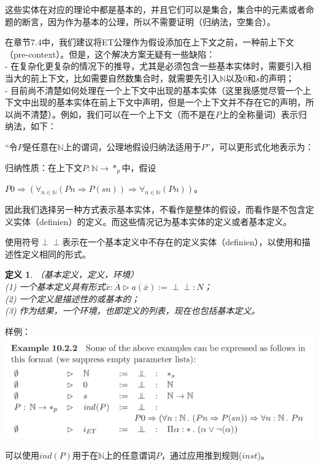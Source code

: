 \documentclass[UTF8]{article}
\newtheorem{thm}{定义}[section]
\newcommand{\dperp}{\perp\!\!\!\perp}
\begin{document}
		这些实体在对应的理论中都是基本的，并且它们可以是集合，集合中的元素或者命题的断言，因为作为基本的公理，所以不需要证明（归纳法，空集合）。
		
		在章节7.4中，我们建议将ET公理作为假设添加在上下文之前，一种前上下文（pre-context）。但是，这个解决方案无疑有一些缺陷：\\
		- 在复杂化更复杂的情况下的推导，尤其是必须包含一些基本实体时，需要引入相当大的前上下文，比如需要自然数集合时，就需要先引入$\mathbb{N}$以及0和$s$的声明；\\
		- 目前尚不清楚如何处理在一个上下文中出现的基本实体（这里我感觉尽管一个上下文中出现的基本实体在前上下文中声明，但是一个上下文并不存在它的声明，所以尚不清楚）。例如，我们可以在一个上下文（而不是在$P$上的全称量词）表示归纳法，如下：
		
		“令$P$是任意在$\mathbb{N}$上的谓词，公理地假设归纳法适用于$P$”，可以更形式化地表示为：
		
		归纳性质：在上下文$P:\mathbb{N}\rightarrow*_p$中，假设
		
		$P0\Rightarrow(\forall_{n\in\mathbb{N}}(Pn\Rightarrow P(sn))\Rightarrow\forall_{n\in\mathbb{N}}(Pn))$。
	
		因此我们选择另一种方式表示基本实体，不看作是整体的假设，而看作是不包含定义实体（definien）的定义。而这些情况记为基本实体的定义或者基本定义。
		
		使用符号$\dperp$表示在一个基本定义中不存在的定义实体（definien），以使用和描述性定义相同的形式。
		
		\begin{thm}（基本定义，定义，环境）\\
			(1) 一个基本定义具有形式$\overline{x}:\overline{A}\triangleright a(\overline{x}):=\dperp:N$；\\
			(2) 一个定义是描述性的或基本的；\\
			(3) 作为结果，一个环境，也即定义的列表，现在也包括基本定义。
		\end{thm}
	
		样例：\\
		\includegraphics[width=0.93\linewidth]{"../imgs/10-1.png"}
		
		可以使用$ind(P)$用于在$\mathbb{N}$上的任意谓词$P$，通过应用推到规则($inst$)。
\end{document}
